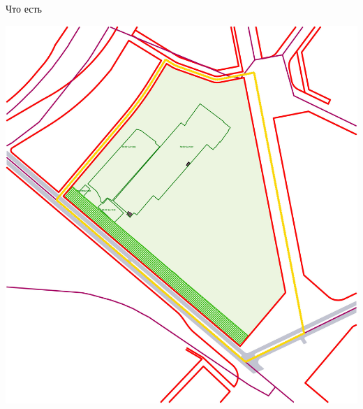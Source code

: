 \documentclass[14pt, fleqn, xcolor={dvipsnames, table}]{beamer}
\begin{document}
\begin{frame}{Что есть}
\begin{center}
                \includegraphics[scale=0.27]{empty.jpg}
            \end{center}                 
        \end{frame}
        
\end{document}
